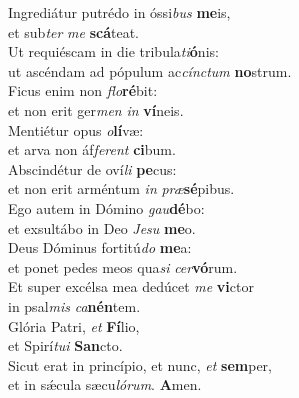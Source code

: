 \oddverse Ingrediátur putrédo in óssi\textit{bus} \textbf{me}is,~\*\\
\oddverse et sub\textit{ter} \textit{me} \textbf{scá}teat.\\
\evenverse Ut requiéscam in die tribula\textit{ti}\textbf{ó}nis:~\*\\
\evenverse ut ascéndam ad pópulum ac\textit{cín}\textit{ctum} \textbf{no}strum.\\
\oddverse Ficus enim non \textit{flo}\textbf{ré}bit:~\*\\
\oddverse et non erit ger\textit{men} \textit{in} \textbf{ví}neis.\\
\evenverse Mentiétur opus \textit{o}\textbf{lí}væ:~\*\\
\evenverse et arva non áf\textit{fe}\textit{rent} \textbf{ci}bum.\\
\oddverse Abscindétur de oví\textit{li} \textbf{pe}cus:~\*\\
\oddverse et non erit arméntum \textit{in} \textit{præ}\textbf{sé}pibus.\\
\evenverse Ego autem in Dómino \textit{gau}\textbf{dé}bo:~\*\\
\evenverse et exsultábo in Deo \textit{Je}\textit{su} \textbf{me}o.\\
\oddverse Deus Dóminus fortitú\textit{do} \textbf{me}a:~\*\\
\oddverse et ponet pedes meos qua\textit{si} \textit{cer}\textbf{vó}rum.\\
\evenverse Et super excélsa mea dedúcet \textit{me} \textbf{vi}ctor~\*\\
\evenverse in psal\textit{mis} \textit{ca}\textbf{nén}tem.\\
\oddverse Glória Patri, \textit{et} \textbf{Fí}lio,~\*\\
\oddverse et Spirí\textit{tu}\textit{i} \textbf{San}cto.\\
\evenverse Sicut erat in princípio, et nunc, \textit{et} \textbf{sem}per,~\*\\
\evenverse et in sǽcula sæcu\textit{ló}\textit{rum}. \textbf{A}men.\\
